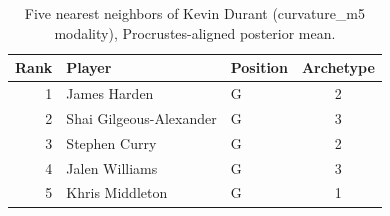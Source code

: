 \begin{table}[htbp]
  \centering\small
  \begin{tabular}{rllc}
    \toprule
    Rank & Player & Position & Archetype \\
    \midrule
    1 & James Harden & G & 2 \\
    2 & Shai Gilgeous-Alexander & G & 3 \\
    3 & Stephen Curry & G & 2 \\
    4 & Jalen Williams & G & 3 \\
    5 & Khris Middleton & G & 1 \\
    \bottomrule
  \end{tabular}
  \caption{Five nearest neighbors of Kevin Durant (curvature_m5 modality), Procrustes-aligned posterior mean.}
  \label{tab:Kevin_Durant_neighbors_curvature_m5}
\end{table}

